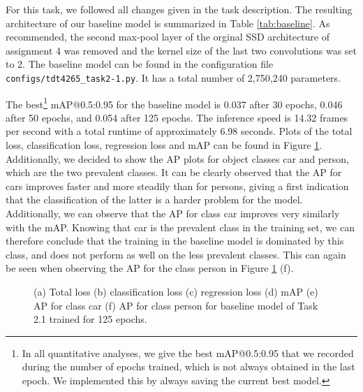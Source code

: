 \documentclass{article}
\begin{document}
For this task, we followed all changes given in the task description. The resulting architecture of our baseline model is summarized in Table \ref{tab:baseline}. As recommended, the second max-pool layer of the orginal SSD architecture of assignment 4  was removed and the kernel size of the last two convolutions was set to 2. The baseline model can be found in the configuration file \texttt{configs/tdt4265\_task2-1.py}. It has a total number of 2,750,240 parameters.

The best\footnote{In all quantitative analyses, we give the best mAP@0.5:0.95 that we recorded during the number of epochs trained, which is not always obtained in the last epoch. We implemented this by always saving the current best model.} mAP@0.5:0.95 for the baseline model is 0.037 after 30 epochs, 0.046 after 50 epochs, and 0.054 after 125 epochs. The inference speed is 14.32 frames per second with a total runtime of approximately 6.98 seconds. Plots of the total loss, classification loss, regression loss and mAP can be found in Figure \ref{fig:loss-2-1}. Additionally, we decided to show the AP plots for object classes car and person, which are the two prevalent classes. It can be clearly observed that the AP for cars improves faster and more steadily than for persons, giving a first indication that the classification of the latter is a harder problem for the model. Additionally, we can observe that the AP for class car improves very similarly with the mAP. Knowing that car is the prevalent class in the training set, we can therefore conclude that the training in the baseline model is dominated by this class, and does not perform as well on the less prevalent classes. This can again be seen when observing the AP for the class person in Figure \ref{fig:loss-2-1} (f).

\begin{figure}[t!]
    \centering
    \subfigure[]{}
    \vspace{-0.15cm}
    \subfigure[]{}
    \subfigure[]{}
    \subfigure[]{}
    \subfigure[]{}
    \subfigure[]{}
    \vspace{-0.4cm}
    \caption{(a) Total loss (b) classification loss (c) regression loss (d) mAP (e) AP for class car (f) AP for class person for baseline model of Task 2.1 trained for 125 epochs.}
    \label{fig:loss-2-1}
\end{figure}
\end{document}
